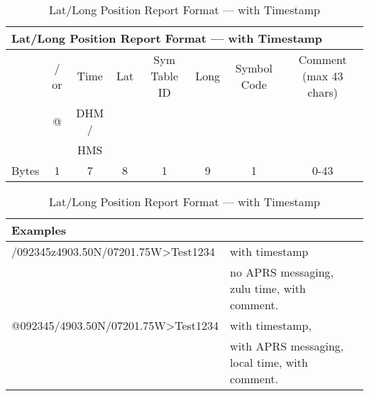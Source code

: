 \begin{table}[H]

  \begin{tabular}{r|c|c|c|c|c|c|c|}
    \hline
    \multicolumn {8}{l}{Lat/Long Position Report Format — with Timestamp} \\
    \hline
    & / or  & Time & Lat & Sym Table ID & Long & Symbol Code & Comment (max 43 chars) \\
    & @     & DHM / &     &              &      &             &  \\
    &       &  HMS  &     &              &      &             &  \\
    \hline
    Bytes & 1 & 7 & 8 & 1 & 9 & 1 & 0-43 \\
    \hline
  \end{tabular}
  
  \vspace{2em}
  
  \begin{tabular}{ll}
    \multicolumn {2}{l}{Examples} \\
    \hline
    /092345z4903.50N/07201.75W>Test1234 & with timestamp  \\
    & no APRS messaging, zulu time, with comment. \\
    @092345/4903.50N/07201.75W>Test1234 &  with timestamp, \\
    & with APRS messaging, local time, with comment. \\
    \hline
    \hline
  \end{tabular}
  
  \caption{Lat/Long Position Report Format — with Timestamp}
\end{table}


